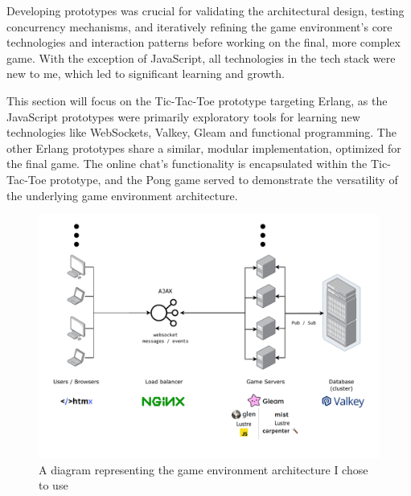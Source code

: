 \documentclass[]{project_interim}
\begin{document}




Developing prototypes was crucial for validating the architectural design,
testing concurrency mechanisms, and iteratively refining the game environment's
core technologies and interaction patterns before working on the final,
more complex game. With the exception of JavaScript,
all technologies in the tech stack were new to me, which led to
significant learning and growth.

This section will focus on the Tic-Tac-Toe prototype targeting Erlang,
as the JavaScript prototypes were primarily exploratory tools for learning
new technologies like WebSockets, Valkey, Gleam and functional programming.
The other Erlang prototypes share a similar, modular implementation,
optimized for the final game. The online chat's functionality is
encapsulated within the Tic-Tac-Toe prototype, and the Pong game
served to demonstrate the versatility of the underlying game
environment architecture.

\begin{figure}[ht!]
  \centering
  \includegraphics[width=\linewidth]{architecture}
  \vspace*{-1.5cm}
  \caption{A diagram representing the game environment architecture I chose to use}
  \label{fig: 2}
\end{figure}
\end{document}
